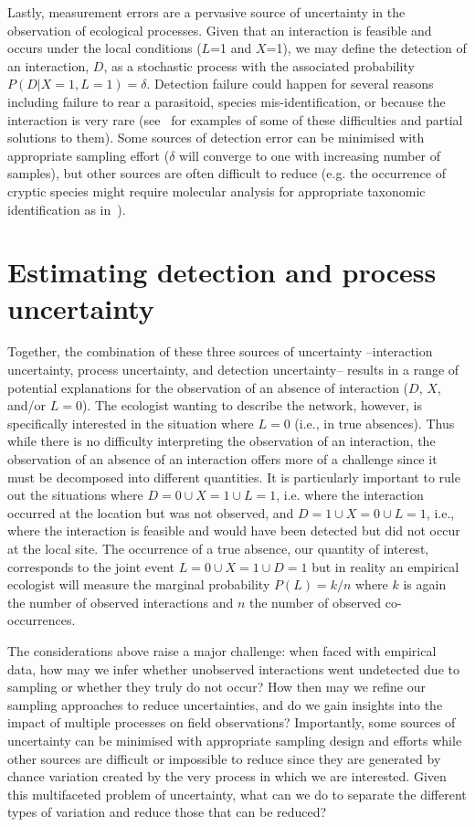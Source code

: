 \documentclass[12pt]{article}
\begin{document}
\begin{spacing}{2.0}
      Lastly, measurement errors are a pervasive source of uncertainty in the observation of ecological processes. Given that an interaction is feasible and occurs under the local conditions ($L$=1 and $X$=1), we may define the detection of an interaction, $D$, as a stochastic process with the associated probability $P(D|X=1,L=1)=\delta$. Detection failure could happen for several reasons including failure to rear a parasitoid, species mis-identification, or because the interaction is very rare (see~\citet{Wirta2014} for examples of some of these difficulties and partial solutions to them). Some sources of detection error can be minimised with appropriate sampling effort ($\delta$ will converge to one with increasing number of samples), but other sources are often difficult to reduce (e.g. the occurrence of cryptic species might require molecular analysis for appropriate taxonomic identification as in~\citealt{Wirta2014,Frost2016}).


\section*{Estimating detection and process uncertainty}

    Together, the combination of these three sources of uncertainty --interaction uncertainty, process uncertainty, and detection uncertainty-- results in a range of potential explanations for the observation of an absence of interaction ($D$, $X$, and/or $L = 0$). The ecologist wanting to describe the network, however, is specifically interested in the situation where $L = 0$ (i.e., in true absences). Thus while there is no difficulty interpreting the observation of an interaction, the observation of an absence of an interaction offers more of a challenge since it must be decomposed into different quantities. It is particularly important to rule out the situations where $D=0 \cup X = 1 \cup L=1$, i.e. where the interaction occurred at the location but was not observed, and $D=1 \cup X = 0 \cup L =1$, i.e., where the interaction is feasible and would have been detected but did not occur at the local site. The occurrence of a true absence, our quantity of interest, corresponds to the joint event $L=0 \cup X=1 \cup D=1$ but in reality an empirical ecologist will measure the marginal probability $P(L) = k/n$ where $k$ is again the number of observed interactions and $n$ the number of observed co-occurrences.


    The considerations above raise a major challenge: when faced with empirical data, how may we infer whether unobserved interactions went undetected due to sampling or whether they truly do not occur? How then may we refine our sampling approaches to reduce uncertainties, and do we gain insights into the impact of multiple processes on field observations? Importantly, some sources of uncertainty can be minimised with appropriate sampling design and efforts while other sources are difficult or impossible to reduce since they are generated by chance variation created by the very process in which we are interested. Given this multifaceted problem of uncertainty, what can we do to separate the different types of variation and reduce those that can be reduced?


\end{spacing}
\end{document}
